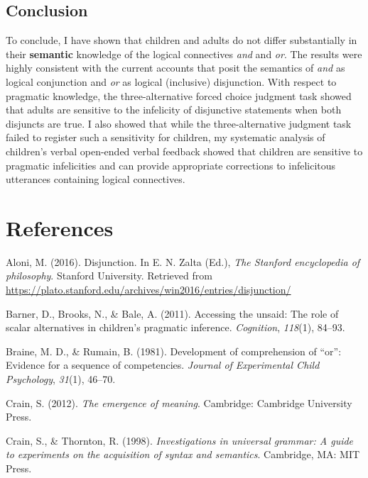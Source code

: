\documentclass[man]{apa6}
\theoremstyle{definition}
\theoremstyle{definition}
\theoremstyle{definition}
\theoremstyle{remark}
\begin{document}
\subsection{Conclusion}\label{conclusion}

To conclude, I have shown that children and adults do not differ
substantially in their \textbf{semantic} knowledge of the logical
connectives \emph{and} and \emph{or}. The results were highly consistent
with the current accounts that posit the semantics of \emph{and} as
logical conjunction and \emph{or} as logical (inclusive) disjunction.
With respect to pragmatic knowledge, the three-alternative forced choice
judgment task showed that adults are sensitive to the infelicity of
disjunctive statements when both disjuncts are true. I also showed that
while the three-alternative judgment task failed to register such a
sensitivity for children, my systematic analysis of children's verbal
open-ended verbal feedback showed that children are sensitive to
pragmatic infelicities and can provide appropriate corrections to
infelicitous utterances containing logical connectives.

\newpage

\section{References}\label{references}

\setlength{\parindent}{-0.5in} \setlength{\leftskip}{0.5in}

\hypertarget{refs}{}
\hypertarget{ref-Aloni2016}{}
Aloni, M. (2016). Disjunction. In E. N. Zalta (Ed.), \emph{The Stanford
encyclopedia of philosophy}. Stanford University. Retrieved from
\url{https://plato.stanford.edu/archives/win2016/entries/disjunction/}

\hypertarget{ref-barner2011accessing}{}
Barner, D., Brooks, N., \& Bale, A. (2011). Accessing the unsaid: The
role of scalar alternatives in children's pragmatic inference.
\emph{Cognition}, \emph{118}(1), 84--93.

\hypertarget{ref-braine1981development}{}
Braine, M. D., \& Rumain, B. (1981). Development of comprehension of
``or'': Evidence for a sequence of competencies. \emph{Journal of
Experimental Child Psychology}, \emph{31}(1), 46--70.

\hypertarget{ref-crain2012emergence}{}
Crain, S. (2012). \emph{The emergence of meaning}. Cambridge: Cambridge
University Press.

\hypertarget{ref-crain1998investigations}{}
Crain, S., \& Thornton, R. (1998). \emph{Investigations in universal
grammar: A guide to experiments on the acquisition of syntax and
semantics}. Cambridge, MA: MIT Press.
\end{document}
